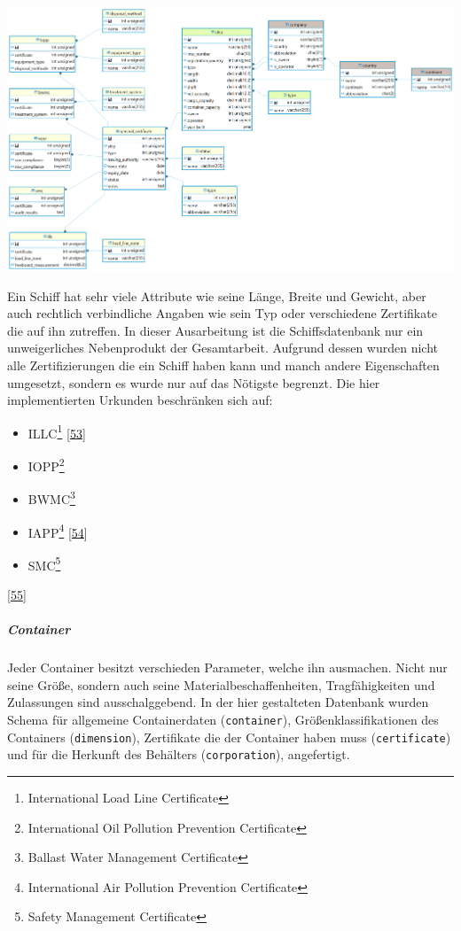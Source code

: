 \documentclass[
    headings=optiontotocandhead,%
    twoside,
    numbers=noenddot,%
    12pt, %
    titlepage, %
    parskip=full, %
    listof=leveldown, 
    numbers=noenddot, %
    a4paper,DIV=14,
    BCOR=15mm,
]{scrbook}
\newcommand{\passthrough}[1]{#1}
\let\origfigure=\figure
\let\endorigfigure=\endfigure
\renewenvironment{figure}[1][]{%
   \origfigure[H]
}{%
   \endorigfigure
}
\providecommand{\tightlist}{%
  \setlength{\itemsep}{0pt}\setlength{\parskip}{0pt}}
\begin{document}
\begin{figure}
\centering
\includegraphics[width=1\textwidth,height=\textheight]{img/Schrempf/ship-erd.png}
\caption{ERD der Schiffdatenbank}
\end{figure}

Ein Schiff hat sehr viele Attribute wie seine Länge, Breite und Gewicht,
aber auch rechtlich verbindliche Angaben wie sein Typ oder verschiedene
Zertifikate die auf ihn zutreffen. In dieser Ausarbeitung ist die
Schiffsdatenbank nur ein unweigerliches Nebenprodukt der Gesamtarbeit.
Aufgrund dessen wurden nicht alle Zertifizierungen die ein Schiff haben
kann und manch andere Eigenschaften umgesetzt, sondern es wurde nur auf
das Nötigste begrenzt. Die hier implementierten Urkunden beschränken
sich auf:

\begin{itemize}
\tightlist
\item
  ILLC\footnote{International Load Line Certificate}
  {[}\protect\hyperlink{ref-imo}{53}{]}
\item
  IOPP\footnote{International Oil Pollution Prevention Certificate}
\item
  BWMC\footnote{Ballast Water Management Certificate}
\item
  IAPP\footnote{International Air Pollution Prevention Certificate}
  {[}\protect\hyperlink{ref-iapp}{54}{]}
\item
  SMC\footnote{Safety Management Certificate}
\end{itemize}

{[}\protect\hyperlink{ref-gpt-schiff-db}{55}{]}

\hypertarget{container}{%
\subparagraph{Container}\label{container}}

Jeder Container besitzt verschieden Parameter, welche ihn ausmachen.
Nicht nur seine Größe, sondern auch seine Materialbeschaffenheiten,
Tragfähigkeiten und Zulassungen sind ausschalggebend. In der hier
gestalteten Datenbank wurden Schema für allgemeine Containerdaten
(\passthrough{\lstinline!container!}), Größenklassifikationen des
Containers (\passthrough{\lstinline!dimension!}), Zertifikate die der
Container haben muss (\passthrough{\lstinline!certificate!}) und für die
Herkunft des Behälters (\passthrough{\lstinline!corporation!}),
angefertigt.
\end{document}
